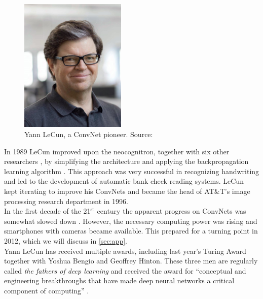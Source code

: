 \begin{figure}
    \centering
    \includegraphics[width=0.45\textwidth]{images/LeCun4.jpg}
    \caption{Yann LeCun, a ConvNet pioneer. Source: \cite{cunpic}}
    \label{fig:lecun}
\end{figure}

In 1989 LeCun improved upon the neocognitron, together with six other researchers \cite{ocr}, by simplifying the architecture and applying the backpropagation learning algorithm \cite{convnet}. This approach was very successful in recognizing handwriting and led to the development of automatic bank check reading systems. LeCun kept iterating to improve his ConvNets and became the head of AT\&T's image processing research department in 1996.\\

In the first decade of the 21$^{\text{st}}$ century the apparent progress on ConvNets was somewhat slowed down \cite{gap}. However, the necessary computing power was rising and smartphones with cameras became available. This prepared for a turning point in 2012, which we will discuss in \autoref{sec:app}.\\

Yann LeCun has received multiple awards, including last year's Turing Award together with Yoshua Bengio and Geoffrey Hinton. These three men are regularly called \textit{the fathers of deep learning} and received the award for ``conceptual and engineering breakthroughs that have made deep neural networks a critical component of computing'' \cite{cunpic, fath}.

























